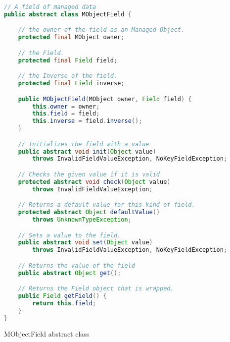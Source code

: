 \begin{sourcecode}
	\begin{lstlisting}[language=Java, escapechar=|]
// A field of managed data
public abstract class MObjectField {

	// the owner of the field as an Managed Object.
	protected final MObject owner;

	// the Field.
	protected final Field field;

	// the Inverse of the field.
	protected final Field inverse;

	public MObjectField(MObject owner, Field field) {
		this.owner = owner;
		this.field = field;
		this.inverse = field.inverse();
	}

	// Initializes the field with a value
	public abstract void init(Object value) 
		throws InvalidFieldValueException, NoKeyFieldException;

	// Checks the given value if it is valid
	protected abstract void check(Object value) 
		throws InvalidFieldValueException;

	// Returns a default value for this kind of field.
	protected abstract Object defaultValue() 
		throws UnknownTypeException;

	// Sets a value to the field.
	public abstract void set(Object value) 
		throws InvalidFieldValueException, NoKeyFieldException;

	// Returns the value of the field
	public abstract Object get();

	// Returns the Field object that is wrapped.
	public Field getField() {
		return this.field;
	}
}
\end{lstlisting}
	\caption{MObjectField abstract class}
	\label{lst:MObjectField}
\end{sourcecode}